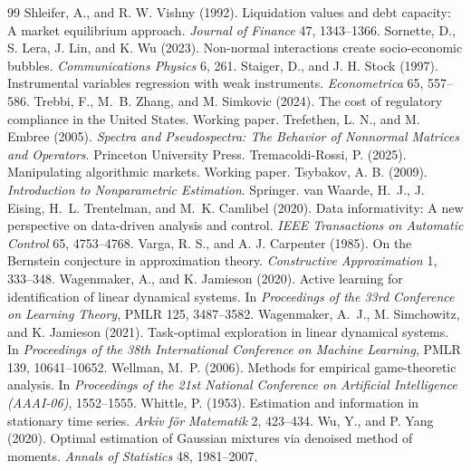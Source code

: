 \begin{thebibliography}{99}
 Shleifer, A., and R. W. Vishny (1992). Liquidation values and debt capacity: A market equilibrium approach. \emph{Journal of Finance} 47, 1343--1366.
 Sornette, D., S. Lera, J. Lin, and K. Wu (2023). Non-normal interactions create socio-economic bubbles. \emph{Communications Physics} 6, 261.
 Staiger, D., and J. H. Stock (1997). Instrumental variables regression with weak instruments. \emph{Econometrica} 65, 557--586.
 Trebbi, F., M.~B. Zhang, and M. Simkovic (2024). The cost of regulatory compliance in the United States. Working paper.
 Trefethen, L. N., and M. Embree (2005). \emph{Spectra and Pseudospectra: The Behavior of Nonnormal Matrices and Operators}. Princeton University Press.
 Tremacoldi-Rossi, P. (2025). Manipulating algorithmic markets. Working paper.
 Tsybakov, A. B. (2009). \emph{Introduction to Nonparametric Estimation}. Springer.
 van Waarde, H.~J., J. Eising, H.~L. Trentelman, and M.~K. Camlibel (2020). Data informativity: A new perspective on data-driven analysis and control. \emph{IEEE Transactions on Automatic Control} 65, 4753--4768.
 Varga, R. S., and A. J. Carpenter (1985). On the Bernstein conjecture in approximation theory. \emph{Constructive Approximation} 1, 333--348.
 Wagenmaker, A., and K. Jamieson (2020). Active learning for identification of linear dynamical systems. In \emph{Proceedings of the 33rd Conference on Learning Theory}, PMLR 125, 3487--3582.
 Wagenmaker, A.~J., M. Simchowitz, and K. Jamieson (2021). Task-optimal exploration in linear dynamical systems. In \emph{Proceedings of the 38th International Conference on Machine Learning}, PMLR 139, 10641--10652.
 Wellman, M.~P. (2006). Methods for empirical game-theoretic analysis. In \emph{Proceedings of the 21st National Conference on Artificial Intelligence (AAAI-06)}, 1552--1555.
 Whittle, P. (1953). Estimation and information in stationary time series. \emph{Arkiv f\"or Matematik} 2, 423--434.
 Wu, Y., and P. Yang (2020). Optimal estimation of Gaussian mixtures via denoised method of moments. \emph{Annals of Statistics} 48, 1981--2007.
\end{thebibliography}

